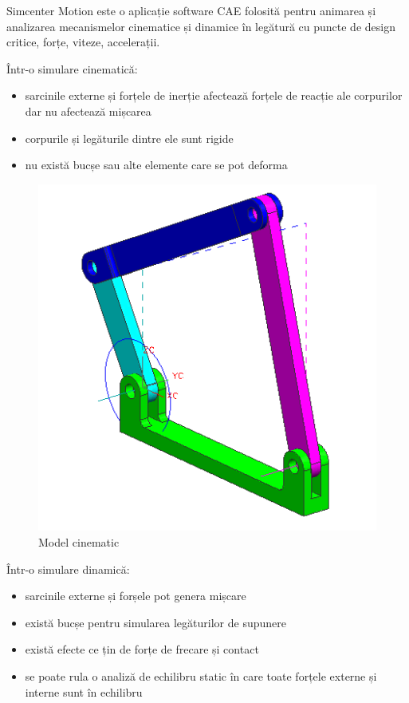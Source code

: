 Simcenter Motion este o aplicație software CAE folosită pentru animarea și analizarea mecanismelor cinematice și dinamice în 
legătură cu puncte de design critice, forțe, viteze, accelerații.\newline

Într-o simulare cinematică:
\begin{itemize}
    \item sarcinile externe și forțele de inerție afectează forțele de reacție ale corpurilor dar nu afectează mișcarea
    \item corpurile și legăturile dintre ele sunt rigide
    \item nu există bucșe sau alte elemente care se pot deforma
\end{itemize}

\begin{figure}[H]
    \begin{center}
        \includegraphics[scale=0.7]{imagini/simcenter/cinematica.png}
        \caption{Model cinematic}
        \label{fig:tabs}
    \end{center}    
\end{figure}

\newpage

Într-o simulare dinamică:
\begin{itemize}
    \item sarcinile externe și forșele pot genera mișcare
    \item există bucșe pentru simularea legăturilor de supunere
    \item există efecte ce țin de forțe de frecare și contact 
    \item se poate rula o analiză de echilibru static în care toate forțele externe și interne sunt în echilibru
\end{itemize}

